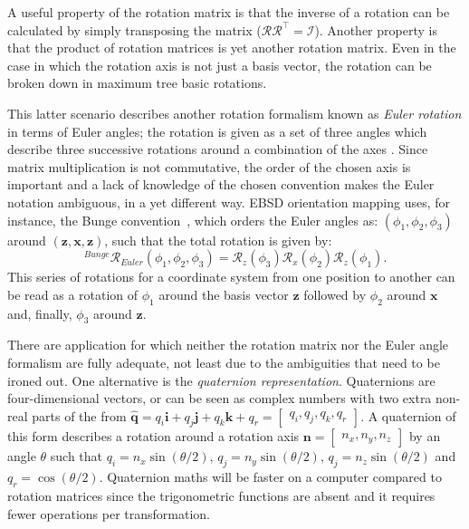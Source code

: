 A useful property of the rotation matrix is that the inverse of a rotation can be calculated by simply transposing the matrix ($\mathcal{R} \mathcal{R}^\intercal  = \mathcal{I}$). Another property is that the product of rotation matrices is yet another rotation matrix. Even in the case in which the rotation axis is not just a basis vector, the rotation can be broken down in maximum tree basic rotations. 

This latter scenario describes another rotation formalism known as \textit{Euler rotation} in terms of Euler angles; the rotation is given as a set of three angles which describe three successive rotations around a combination of the axes . Since matrix multiplication is not commutative, the order of the chosen axis is important and a lack of knowledge of the chosen convention makes the Euler notation ambiguous, in a yet different way. EBSD orientation mapping uses, for instance, the Bunge convention~\cite{Bunge}, which orders the Euler angles as: $(\phi_1, \phi_2, \phi_3)$ around $(\mathbf{z}, \mathbf{x}, \mathbf{z})$, such that the total rotation is given by:
\begin{equation*}
^{Bunge}\mathcal{R}_{Euler}(\phi_1, \phi_2, \phi_3) = \mathcal{R}_z(\phi_3) \mathcal{R}_x(\phi_2) \mathcal{R}_z(\phi_1).
\end{equation*}
This series of rotations for a coordinate system from one position to another can be read as a rotation of $\phi_1$ around the basis vector $\mathbf{z}$ followed by  $\phi_2$ around  $\mathbf{x}$ and, finally, $\phi_3$ around $\mathbf{z}$. 

There are application for which neither the rotation matrix nor the Euler angle formalism are fully adequate, not least due to the ambiguities that need to be ironed out. One alternative is the \textit{quaternion representation}. Quaternions are four-dimensional vectors, or can be seen as complex numbers with two extra non-real parts of the from $\hat{\mathbf{q}}=q_i \mathbf{i} + q_j \mathbf{j} +q_k \mathbf{k} +q_r= \begin{bmatrix}q_i, q_j, q_k, q_r \end{bmatrix}$. A quaternion of this form describes a rotation around a rotation axis $\mathbf{n} = \begin{bmatrix} n_x, n_y, n_z\end{bmatrix}$ by an angle $\theta$ such that $q_i=n_x \sin{(\theta/2)}$, $q_j=n_y \sin{(\theta/2)}$, $q_j=n_z \sin{(\theta/2)}$ and $q_r= \cos{(\theta/2)}$. Quaternion maths will be faster on a computer compared to rotation matrices since the trigonometric functions are absent and it requires fewer operations per transformation. 

